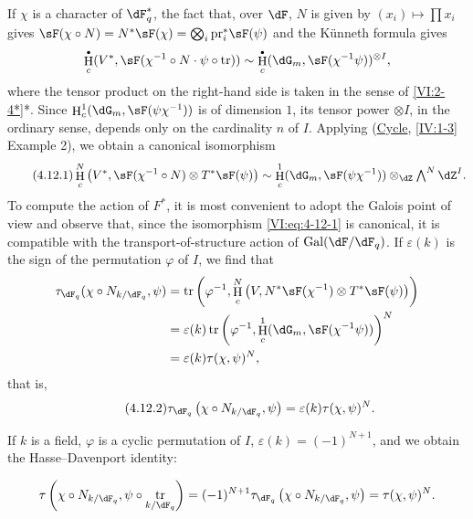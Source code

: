 \documentclass[oneside]{book}
\DeclareMathOperator{\gal}{Gal}
\DeclareMathOperator{\h}{H}
\DeclareMathOperator{\tr}{tr}
\newcounter{char}
\newcommand{\pr}{\mathrm{pr}} %
\theoremstyle{sga-source}
\theoremstyle{sga-source-dash}
\theoremstyle{sga-source-dotdash}
\theoremstyle{sga-source-number-note-dash}
\theoremstyle{sga-source-note-number-dotdash}
\theoremstyle{sga-source-example-dotdash}
\theoremstyle{sga-source-inline-number}
\theoremstyle{sga-source-bare-number}
\theoremstyle{sga-source}
\let\oldbullet\bullet
\renewcommand{\bullet}{\textnormal{\tiny$\oldbullet$}}
\newcommand{\PrintPage}[1]{}\newcommand{\MathPage}[1]{}\newcommand{\PrintCite}[2]{#1}\newcommand{\var}[3]{#1}
\begin{document}
If $\chi$ is a character of $\dF_q^\ast$, the fact that, over $\dF$, $N$ 
is given by $(x_i)\mapsto \prod x_i$ gives 
$\sF(\chi\circ N)=\var{N^\ast\sF(\chi) = \bigotimes_i \pr_i^\ast\sF(\psi)}{N^\ast\sF(\chi) = \bigotimes_i \pr_i^\ast\sF(\chi)}{S45-SOL-0830}$ 
and the K\"unneth formula gives 
\[
  \h_c^\bullet(V^\ast,\sF(\chi^{-1}\circ N\cdot \psi\circ \tr)) \sim \h_c^\bullet(\dG_m,\sF(\chi^{-1}\psi))^{\otimes I} \text{,} 
\]
where the tensor product on the right-hand side is taken in the sense of 
\ref{VI:2-4*}*. Since $\h_c^1(\dG_m,\sF(\psi\chi^{-1}))$ is of dimension 
$1$, its tensor power $\otimes I$, in the ordinary sense, depends only on 
\var{the cardinality $n$ of $I$}{the cardinality $N$ of $I$}{S45-SOL-0832}. Applying (\hyperref[IV]{Cycle}, \ref{IV:1-3} Example 
2), we obtain a canonical isomorphism 
\begin{equation*}\tag{4.12.1}\label{VI:eq:4-12-1}
  \h_c^N\left(V^\ast,\sF(\chi^{-1}\circ N)\otimes T^\ast \sF(\psi)\right) \sim \var{\h_c^1(\dG_m,\sF(\psi\chi^{-1})) \otimes_\dZ}{\h_c^1(\dG_m,\sF(\psi\chi^{-1}))^{\otimes N} \otimes_\dZ}{S45-SOL-0834} \textstyle \bigwedge^N \dZ^I \text{.}
\end{equation*}
To compute the action of $F^\ast$, it is most convenient to adopt the Galois 
point of view and observe that, since the isomorphism \eqref{VI:eq:4-12-1} is 
canonical, it is compatible with the transport-of-structure action of 
$\gal(\dF/\dF_q)$. If $\varepsilon(k)$ is the sign of the permutation 
$\varphi$ of $I$, we find that 
\begin{align*} 
  \tau_{\dF_q}(\chi\circ N_{k/\dF_q},\psi) 
    &= \tr\left(\varphi^{-1},\var{\h_c^N\left(V,}{\h_c^N\left(V^\ast,}{S45-SOL-0833}N^\ast\sF(\chi^{-1})\otimes T^\ast \sF(\psi)\right)\right) \\ 
    &= \varepsilon(k) \tr\left(\varphi^{-1},\h_c^1(\dG_m,\sF(\chi^{-1}\psi))\right)^N \\
    &= \varepsilon(k) \tau(\chi,\psi)^N \text{,} 
\end{align*}
that is, 
\begin{equation*}\tag{4.12.2}\label{VI:eq:4-12-2}
  \tau_{\dF_q}\left(\chi\circ N_{k/\dF_q},\psi\right) = \varepsilon(k) \tau(\chi,\psi)^N \text{.} 
\end{equation*}

If $k$ is a field, $\varphi$ is a cyclic permutation of $I$, 
$\varepsilon(k) = (-1)^{N+1}$, and we obtain the Hasse--Davenport identity: 
\PrintPage{203}
\[
  \tau\left(\chi\circ N_{k/\dF_q},\psi\circ \tr_{k/\dF_q}\right) = (-1)^{N+1} \tau_{\dF_q}\left(\chi\circ N_{k/\dF_q},\psi\right) = \tau(\chi,\psi)^N \text{.} 
\]
\end{document}
